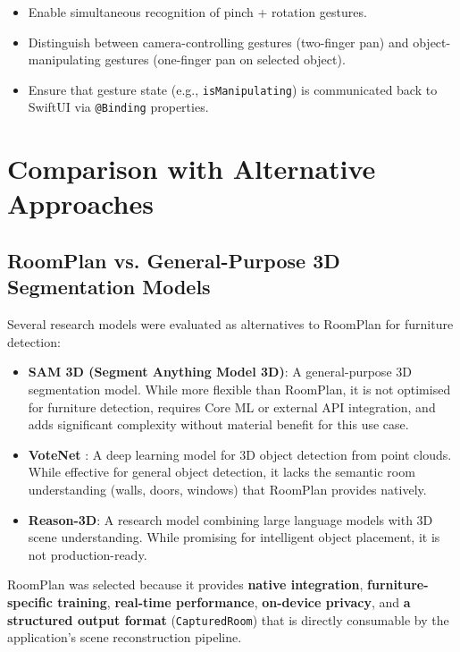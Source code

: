 \begin{itemize}
    \item Enable simultaneous recognition of pinch + rotation gestures.
    \item Distinguish between camera-controlling gestures (two-finger pan) and object-manipulating gestures (one-finger pan on selected object).
    \item Ensure that gesture state (e.g., \texttt{isManipulating}) is communicated back to SwiftUI via \texttt{@Binding} properties.
\end{itemize}


\section{Comparison with Alternative Approaches}
\label{sec:comparison}

\subsection{RoomPlan vs. General-Purpose 3D Segmentation Models}

Several research models were evaluated as alternatives to RoomPlan for furniture detection:

\begin{itemize}
    \item \textbf{SAM 3D (Segment Anything Model 3D)}: A general-purpose 3D segmentation model. While more flexible than RoomPlan, it is not optimised for furniture detection, requires Core ML or external API integration, and adds significant complexity without material benefit for this use case.

    \item \textbf{VoteNet} \cite{qi2019votenet}: A deep learning model for 3D object detection from point clouds. While effective for general object detection, it lacks the semantic room understanding (walls, doors, windows) that RoomPlan provides natively.

    \item \textbf{Reason-3D}: A research model combining large language models with 3D scene understanding. While promising for intelligent object placement, it is not production-ready.
\end{itemize}

RoomPlan was selected because it provides \textbf{native integration}, \textbf{furniture-specific training}, \textbf{real-time performance}, \textbf{on-device privacy}, and \textbf{a structured output format} (\texttt{CapturedRoom}) that is directly consumable by the application's scene reconstruction pipeline.

